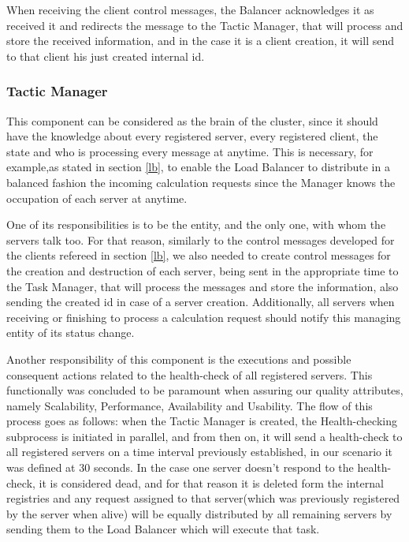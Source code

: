 \documentclass[12pt]{article}
\begin{document}
When receiving the client control messages, the Balancer acknowledges it as received it and redirects the message to the Tactic Manager, that will process and store the received information, and in the case it is a client creation, it will send to that client his just created internal id.

\subsubsection{Tactic Manager}
This component can be considered as the brain of the cluster, since it should have the knowledge about every registered server, every registered client, the state and who is processing every message at anytime. This is necessary, for example,as stated in section \ref{lb}, to enable the Load Balancer to distribute in a balanced fashion the incoming calculation requests since the Manager knows the occupation of each server at anytime.

One of its responsibilities is to be the entity, and the only one, with whom the servers talk too. For that reason, similarly to the control messages developed for the clients refereed in section \ref{lb}, we also needed to create control messages for the creation and destruction of each server, being sent in the appropriate time to the Task Manager, that will process the messages and store the information, also sending the created id in case of a server creation. Additionally, all servers when receiving or finishing to process a calculation request should notify this managing entity of its status change.

Another responsibility of this component is the executions and possible consequent actions related to the health-check of all registered servers. This functionally was concluded to be paramount when assuring our quality attributes, namely Scalability, Performance, Availability and Usability. The flow of this process goes as follows: when the Tactic Manager is created, the Health-checking subprocess is initiated in parallel, and from then on, it will send a health-check to all registered servers on a time interval previously established, in our scenario it was defined at 30 seconds. In the case one server doesn't respond to the health-check, it is considered dead, and for that reason it is deleted form the internal registries and any request assigned to that server(which was previously registered by the server when alive) will be equally distributed by all remaining servers by sending them to the Load Balancer which will execute that task.
\end{document}
